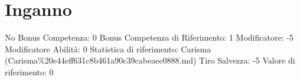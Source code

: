 \section{Inganno}\label{inganno}

\begin{description}
\tightlist
\item[Tags: ABI]
No Bonus Competenza: 0 Bonus Competenza di Riferimento: 1 Modificatore:
-5 Modificatore Abilità: 0 Statistica di riferimento: Carisma
(Carisma\%20e44eff631c8b461a90c39cabeaec0888.md) Tiro Salvezza: -5
Valore di riferimento: 0
\end{description}
